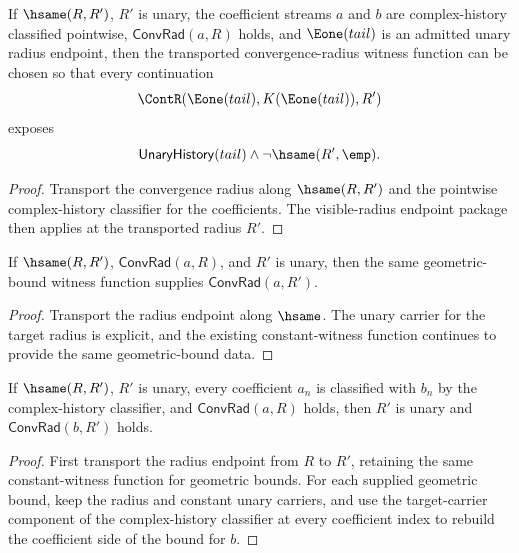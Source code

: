 \begin{theorem}
\label{thm:conv-rad-classifier-visible-radius-witness-endpoint-package}
If $\hsame(R,R')$, $R'$ is unary, the coefficient streams $a$ and $b$ are
complex-history classified pointwise, $\mathsf{ConvRad}(a,R)$ holds, and
$\Eone(tail)$ is an admitted unary radius endpoint, then the transported
convergence-radius witness function can be chosen so that every continuation
$$
\ContR(\Eone(tail),K(\Eone(tail)),R')
$$
exposes
$$
\mathsf{UnaryHistory}(tail)\land \neg\hsame(R',\emp).
$$
\end{theorem}
\begin{proof}
Transport the convergence radius along $\hsame(R,R')$ and the pointwise
complex-history classifier for the coefficients. The visible-radius endpoint
package then applies at the transported radius $R'$.
\end{proof}

\begin{lemma}
\label{lem:conv-rad-radius-transport}
If \(\hsame(R, R')\), \(\mathsf{ConvRad}(a, R)\), and \(R'\) is unary, then the same geometric-bound witness function supplies \(\mathsf{ConvRad}(a, R')\).
\end{lemma}
\begin{proof}
Transport the radius endpoint along \(\hsame\). The unary carrier for the target radius is explicit, and the existing constant-witness function continues to provide the same geometric-bound data.
\end{proof}

\begin{lemma}
\label{lem:conv-rad-radius-coefficient-classifier-transport}
If \(\hsame(R,R')\), \(R'\) is unary, every coefficient \(a_n\) is classified
with \(b_n\) by the complex-history classifier, and \(\mathsf{ConvRad}(a,R)\)
holds, then \(R'\) is unary and \(\mathsf{ConvRad}(b,R')\) holds.
\end{lemma}
\begin{proof}
First transport the radius endpoint from \(R\) to \(R'\), retaining the same
constant-witness function for geometric bounds. For each supplied geometric
bound, keep the radius and constant unary carriers, and use the target-carrier
component of the complex-history classifier at every coefficient index to
rebuild the coefficient side of the bound for \(b\).
\end{proof}


